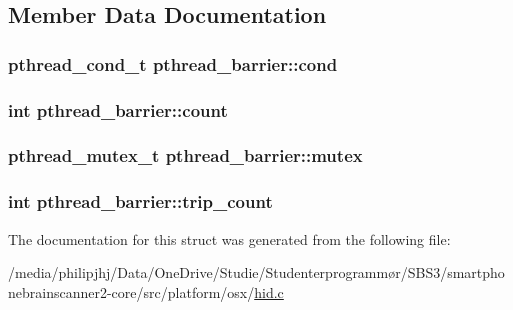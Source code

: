 \subsection{Member Data Documentation}
\hypertarget{structpthread__barrier_a4a4480c72b3ff4dda0bbb2f3cccff810}{
\subsubsection[{cond}]{\setlength{\rightskip}{0pt plus 5cm}pthread\-\_\-cond\-\_\-t pthread\-\_\-barrier\-::cond}}\label{structpthread__barrier_a4a4480c72b3ff4dda0bbb2f3cccff810}
\hypertarget{structpthread__barrier_a991aa7493d99b8c4bae94f9a579e6173}{
\subsubsection[{count}]{\setlength{\rightskip}{0pt plus 5cm}int pthread\-\_\-barrier\-::count}}\label{structpthread__barrier_a991aa7493d99b8c4bae94f9a579e6173}
\hypertarget{structpthread__barrier_aebedbcf959b1296f0d8b1164d4d46658}{
\subsubsection[{mutex}]{\setlength{\rightskip}{0pt plus 5cm}pthread\-\_\-mutex\-\_\-t pthread\-\_\-barrier\-::mutex}}\label{structpthread__barrier_aebedbcf959b1296f0d8b1164d4d46658}
\hypertarget{structpthread__barrier_a947854bc107b3e00b060cee8fb9ca1fd}{
\subsubsection[{trip\-\_\-count}]{\setlength{\rightskip}{0pt plus 5cm}int pthread\-\_\-barrier\-::trip\-\_\-count}}\label{structpthread__barrier_a947854bc107b3e00b060cee8fb9ca1fd}


The documentation for this struct was generated from the following file\-:\begin{DoxyCompactItemize}
\item 
/media/philipjhj/\-Data/\-One\-Drive/\-Studie/\-Studenterprogrammør/\-S\-B\-S3/smartphonebrainscanner2-\/core/src/platform/osx/\hyperlink{osx_2hid_8c}{hid.\-c}\end{DoxyCompactItemize}
